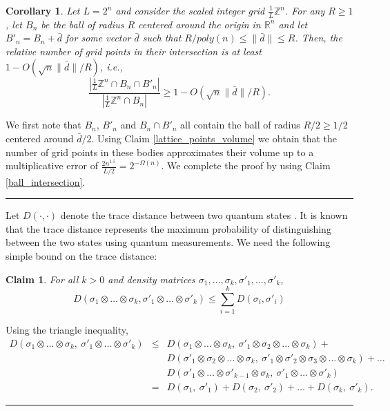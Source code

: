 \documentclass[11pt]{article}
\newtheorem{claim}[theorem]{Claim}
\newtheorem{corollary}[theorem]{Corollary}
\newcommand{\qedsymb}{\hfill{\rule{2mm}{2mm}}}
\newenvironment{proof}{\begin{trivlist}
\item[\hspace{\labelsep}{\sl\noindent Proof:\/}]
}{\qedsymb\end{trivlist}}
\def\Z{\mathbb{Z}}
\def\R{\mathbb{R}}
\begin{document}
\begin{corollary}\label{ball_intersection_cor}
Let $L=2^n$ and consider the scaled integer grid $\frac{1}{L} \Z^n$. For any $R\ge 1$, let $B_n$ be the ball of radius
$R$ centered around the origin in $\R^n$ and let $B'_n=B_n+\bar{d}$ for some vector $\bar{d}$ such that $R/poly(n) \le
\|\bar{d}\| \le R$. Then, the relative number of grid points in their intersection is at least $1-O(\sqrt{n} \| \bar{d}
\|/R)$, i.e.,
$$ \frac{ | \frac{1}{L}\Z^n \cap B_n \cap B'_n | } { | \frac{1}{L}\Z^n \cap B_n | } \ge 1-O(\sqrt{n} \| \bar{d} \| / R).$$
\end{corollary}
\begin{proof}
We first note that $B_n$, $B'_n$ and $B_n \cap B'_n$ all contain the ball of radius $R/2 \ge 1/2$ centered around
$\bar{d}/2$. Using Claim \ref{lattice_points_volume} we obtain that the number of grid points in these bodies
approximates their volume up to a multiplicative error of $\frac{2n^{1.5}}{L/2}=2^{-\Omega(n)}$. We complete the proof
by using Claim \ref{ball_intersection}.
\end{proof}

Let $D(\cdot,\cdot)$ denote the trace distance between two quantum states \cite{NielsenChuang}. It is known that the
trace distance represents the maximum probability of distinguishing between the two states using quantum measurements.
We need the following simple bound on the trace distance:
\begin{claim}\label{trace_distance_tensor}
For all $k>0$ and density matrices $\sigma_1,\ldots,\sigma_k,\sigma'_1,\ldots,\sigma'_k$,
$$ D(\sigma_1\otimes \ldots \otimes \sigma_k, \sigma'_1\otimes \ldots \otimes \sigma'_k)
   \le \sum_{i=1}^k D(\sigma_i, \sigma'_i)$$
\end{claim}
\begin{proof}
Using the triangle inequality,
 \begin{eqnarray*}
  D(\sigma_1\otimes \ldots \otimes \sigma_k ,~ \sigma'_1\otimes \ldots \otimes \sigma'_k)
 &\le&D(\sigma_1\otimes \ldots \otimes \sigma_k,~
       \sigma'_1\otimes \sigma_2 \otimes \ldots \otimes \sigma_k) + \\
 &&D(\sigma'_1\otimes \sigma_2 \otimes \ldots \otimes \sigma_k,~
       \sigma'_1\otimes \sigma'_2 \otimes \sigma_3 \otimes \ldots \otimes \sigma_k) + \ldots \\
 &&D(\sigma'_1\otimes \ldots \otimes \sigma'_{k-1} \otimes \sigma_k,~
       \sigma'_1\otimes \ldots \otimes \sigma'_k)  \\
 &=& D(\sigma_1,~ \sigma'_1)+D(\sigma_2,~ \sigma'_2)+\ldots+D(\sigma_k,~ \sigma'_k).
 \end{eqnarray*}
\end{proof}
\end{document}
